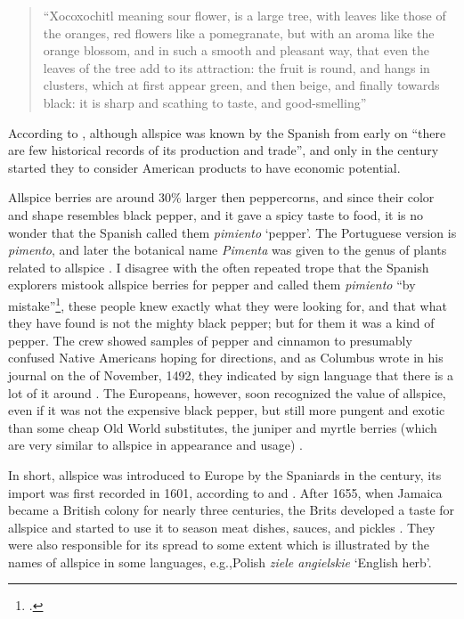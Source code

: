 \begin{quote}
    ``Xocoxochitl meaning sour flower, is a large tree, with leaves like those of the oranges, red flowers like a pomegranate, but with an aroma like the orange blossom, and in such a smooth and pleasant way, that even the leaves of the tree add to its attraction: the fruit is round, and hangs in clusters, which at first appear green, and then beige, and finally towards black: it is sharp and scathing to taste, and good-smelling'' 
\end{quote}

According to \textcite{machuca_past_2020}, although allspice was known by the Spanish from early on ``there are few historical records of its production and trade'', and only in the  century started they to consider American products to have economic potential.
 
Allspice berries are around 30\% larger then peppercorns, and since their color and shape resembles black pepper, and it gave a spicy taste to food, it is no wonder that the Spanish called them \textit{pimiento} `pepper'. The Portuguese version is \textit{pimento}, and later the botanical name \textit{Pimenta} was given to the genus of plants related to allspice \autocite[26]{farrell_spices_1985}. I disagree with the often repeated trope that the Spanish explorers mistook allspice berries for pepper and called them \textit{pimiento} ``by mistake''\footcite[allspice ]{britannica_spice_2022}, these people knew exactly what they were looking for, and that what they have found is not the mighty black pepper; but for them it was a kind of pepper. The crew showed samples of pepper and cinnamon to presumably confused Native Americans hoping for directions, and as Columbus wrote in his journal on the  of November, 1492, they indicated by sign language that there is a lot of it around \autocites[21]{duke_crc_2002}[67]{columbus_journal_2010}. The Europeans, however, soon recognized the value of allspice, even if it was not the expensive black pepper, but still more pungent and exotic than some cheap Old World substitutes, the juniper and myrtle berries (which are very similar to allspice in appearance and usage)  \autocite[150]{dalby_dangerous_2000}.

In short, allspice was introduced to Europe by the Spaniards in the  century, its import was first recorded in 1601, according to \textcite{britannica_allspice_nodate} and \textcite[26]{farrell_spices_1985}. After 1655, when Jamaica became a British colony for nearly three centuries, the Brits developed a taste for allspice and started to use it to season meat dishes, sauces, and pickles \autocite[74]{green_field_2006}. They were also responsible for its spread to some extent which is illustrated by the names of allspice in some languages, e.g.,Polish \textit{ziele angielskie} `English herb'.

